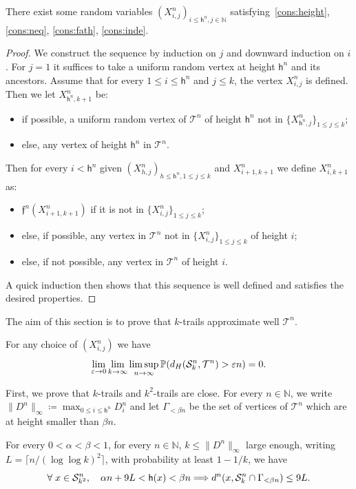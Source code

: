 \documentclass[AHL,Unicode,published]{cedram}
\newcommand{\proba}[1]{\mathbb{P}\left(#1\right)}
\newcommand{\e}{\varepsilon}
\newcommand{\N}{\mathbb{N}}
\newcommand{\1}{\mathbbm{1}}
\newcommand{\fath}{\mathfrak{f}}
\newcommand{\trail}{\mathcal{S}}
\newcommand{\T}{\mathcal{T}}
\newcommand{\h}{\mathsf{h}}
\let\originalleft\left
\let\originalright\right
\renewcommand{\left}{\mathopen{}\mathclose\bgroup\originalleft}
\renewcommand{\right}{\aftergroup\egroup\originalright}
\renewcommand*{\to}{\mathchoice{\longrightarrow}{\rightarrow}{\rightarrow}{\rightarrow}}
\renewcommand*{\implies}{\mathchoice{\Longrightarrow}{\Rightarrow}{\Rightarrow}{\Rightarrow}}
\let\oldforall\forall
\renewcommand*{\forall}{\mathrel{\oldforall}}
\begin{document}
\begin{lemm}\label{lem:trailconstruct}
There exist some random variables $(X^n_{i,j})_{i\leq \h^n,j\in \N}$ satisfying~\ref{cons:height}, \ref{cons:neq}, \ref{cons:fath}, \ref{cons:inde}.
\end{lemm}

\begin{proof}
We construct the sequence by induction on $j$ and downward induction on $i$. For $j=1$ it suffices to take a uniform random vertex at height $\h^n$ and its ancestors. Assume that for every $1\leq i \leq \h^n$ and $j\leq k$, the vertex $X^n_{i,j}$ is defined. Then we let $X_{\h^n,k+1}^n$ be:
\begin{itemize}
\item if possible, a uniform random vertex of $\T^n$ of height $\h^n$ not in $\{X_{\h^n,j}^n\}_{1\leq j \leq k}$;
\item else, any vertex of height $\h^n$ in $\T^n$.
\end{itemize}
Then for every $i<\h^n$ given $(X_{h,j}^n)_{h\leq \h^n, 1\leq j\leq k}$ and $X_{i+1,k+1}^n$ we define $X_{i,k+1}^n$ as:
\begin{itemize}
\item $\fath^n(X_{i+1,k+1}^n)$ if it is not in $\{X_{i,j}^n\}_{1\leq j \leq k}$;
\item else, if possible, any vertex in $\T^n$ not in $\{X_{i,j}^n\}_{1\leq j \leq k}$ of height $i$;
\item else, if not possible, any vertex in $\T^n$ of height $i$.
\end{itemize}
A quick induction then shows that this sequence is well defined and satisfies the desired properties.
\end{proof}

The aim of this section is to prove that $k$-trails approximate well $\T^n$.

\begin{prop}\label{pro:chain}
For any choice of $(X_{i,j}^n)$ we have
\[
\lim_{\e \to 0} \lim_{k\to \infty} \limsup_{n\to \infty} \proba{d_H(\trail_k^n,\T^n)>\e n}=0.
\]
\end{prop}

First, we prove that $k$-trails and $k^2$-trails are close. For every $n\in \N$, we write $\|D^n\|_\infty \coloneqq\max_{0\leq i \leq \h^n} D_i^n$ and let $\Gamma_{<\beta n}$ be the set of vertices of $\T^n$ which are at height smaller than $\beta n$.

\begin{lemm}\label{lem:chain}
For every $0<\alpha<\beta<1$, for every $n\in \N$, $k\leq \|D^n\|_\infty$ large enough, writing $L=\lceil n/(\log\log k)^2\rceil$, with probability at least $1-1/k$, we have
\[
\forall x\in \trail_{k^2}^n,\quad \alpha n+9L<\h(x)<\beta n \implies d^n\left(x,\trail_{k}^n \cap \Gamma_{<\beta n}\right)\leq 9 L.
\]
\end{lemm}
\end{document}
